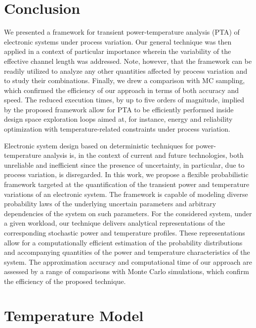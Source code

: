 \section{Conclusion}

We presented a framework for transient power-temperature analysis (PTA) of
electronic systems under process variation. Our general technique was then
applied in a context of particular importance wherein the variability of the
effective channel length was addressed. Note, however, that the framework can be
readily utilized to analyze any other quantities affected by process variation
and to study their combinations. Finally, we drew a comparison with MC sampling,
which confirmed the efficiency of our approach in terms of both accuracy and
speed. The reduced execution times, by up to five orders of magnitude, implied
by the proposed framework allow for PTA to be efficiently performed inside
design space exploration loops aimed at, for instance, energy and reliability
optimization with temperature-related constraints under process variation.

Electronic system design based on deterministic techniques for power-temperature
analysis is, in the context of current and future technologies, both unreliable
and inefficient since the presence of uncertainty, in particular, due to process
variation, is disregarded. In this work, we propose a flexible probabilistic
framework targeted at the quantification of the transient power and temperature
variations of an electronic system. The framework is capable of modeling diverse
probability laws of the underlying uncertain parameters and arbitrary
dependencies of the system on such parameters. For the considered system, under
a given workload, our technique delivers analytical representations of the
corresponding stochastic power and temperature profiles. These representations
allow for a computationally efficient estimation of the probability
distributions and accompanying quantities of the power and temperature
characteristics of the system. The approximation accuracy and computational time
of our approach are assessed by a range of comparisons with Monte Carlo
simulations, which confirm the efficiency of the proposed technique.

\section{Temperature Model}

